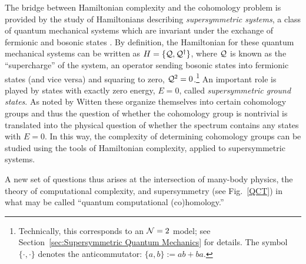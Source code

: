 \documentclass[11pt]{article}
\numberwithin{equation}{section}
\def\cN{{\cal N}}
\def\cQ{{\cal Q}}
\renewcommand\( {\left(}
\renewcommand\) {\right)}
\begin{document}
The bridge between  Hamiltonian complexity and the cohomology problem is provided by the study of Hamiltonians describing {\it supersymmetric systems}, a class of quantum mechanical systems which are invariant under the exchange of fermionic and bosonic states \cite{Nicolai:1976xp, Witten:1981nf,Witten:1982df,Witten:1982im}. By definition, the Hamiltonian for these quantum mechanical systems  can be written as $H=\{\cQ,\cQ^\dagger\}$, where $\cQ$ is known as the ``supercharge'' of the system, an operator sending bosonic states into fermionic states (and vice versa) and squaring to zero, $\cQ^2=0$.\footnote{Technically, this corresponds to an $\cN=2$ model; see Section~\ref{sec:Supersymmetric Quantum Mechanics} for details. The symbol $\{\cdot,\cdot\}$ denotes the anticommutator: $\{a,b\} := ab + ba$. } An important role is played by states with exactly zero energy, $E=0$, called {\it supersymmetric ground states}. As noted by Witten \cite{Witten:1982df,Witten:1982im} these organize themselves into certain cohomology groups and thus  the question of whether the cohomology group is nontrivial is translated into the physical question of whether the spectrum contains  any states with $E=0$. In this way, the complexity of determining cohomology groups can be studied using the tools of  Hamiltonian complexity, applied to supersymmetric systems. 

A new set of questions thus arises at the intersection of many-body physics, the theory of computational complexity, and supersymmetry (see Fig.~\ref{QCT}) in what may be called ``quantum computational (co)homology.'' 
\end{document}
